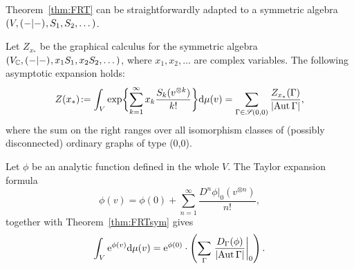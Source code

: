 Theorem~\ref{thm:FRT} can be straightforwardly adapted to a symmetric
algebra $(V, \inner{-}{-},\break S_1, S_2, \dots)$.
\begin{theorem}\label{thm:FRTsym}
  Let $Z_{x_*}$ be the graphical calculus for the symmetric algebra
  $(V_{\mathbb{C}}, ( -|- )_{}, x_1S_1, x_2S_2, \dots)$, where
$x_1,x_2,\dots$ are
  complex variables. The following asymptotic expansion holds:
  \begin{equation*}
    Z(x_*)\joinrel:=\int_V \exp \biggl\{ \sum_{k=1}^\infty x_k
    \frac{S_k(v\tp{k})}{k!}
    \biggr\} \ud\mu(v)
    = \sum_{\Gamma\in\SG(0,0)} \frac {Z_{x_*}(\Gamma)} {\card{\Aut\Gamma}},
  \end{equation*}
  where the sum on the right ranges over all isomorphism classes of
(possibly disconnected) ordinary graphs of type (0,0).
\end{theorem}

\begin{example} 
  Let $\phi$ be an analytic function defined in the whole $V$. The
  Taylor expansion formula
\begin{equation*}
\phi(v)=\phi(0)+\sum_{n=1}^{\infty}\frac{D^n\phi\vert_0(v^{\otimes
n})}{n!},
\end{equation*}
together with Theorem~\ref{thm:FRTsym}  gives
\begin{equation}
  \int_V \mathrm{e}^{\phi(v)} \mathrm{d}
  \mu(v) = \mathrm{e}^{\phi(0)} \cdot \left(\sum_\Gamma
    \left.\frac{D_\Gamma(\phi)}{\lvert\operatorname{Aut}\Gamma\rvert}\right\vert_0\right).
\end{equation}
\end{example}


